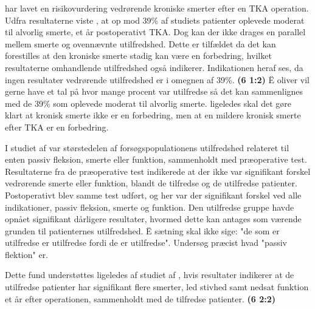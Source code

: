 \cite{Sakellariou2016} har lavet en risikovurdering vedrørende kroniske smerter efter en TKA operation. Udfra resultaterne viste \cite{Sakellariou2016}, at op mod 39\% af studiets patienter oplevede moderat til alvorlig smerte, et år postoperativt TKA. Dog kan der ikke drages en parallel mellem smerte og ovennævnte utilfredshed. Dette er tilfældet da det kan forestilles at den kroniske smerte stadig kan være en forbedring, hvilket resultaterne omhandlende utilfredshed også indikerer. Indikationen heraf ses, da ingen resultater vedrørende utilfredshed er i omegnen af 39\%. \textbf{(6 1:2)} \citep{Sakellariou2016} 
Ë oliver vil gerne have et tal på hvor mange procent var utilfredse så det kan sammenlignes med de 39\% som oplevede moderat til alvorlig smerte. ligeledes skal det gøre klart at kronisk smerte ikke er en forbedring, men at en mildere kronisk smerte efter TKA er en forbedring.

I studiet af \cite{Jacobs2014} var størstedelen af forsøgspopulationens utilfredshed relateret til enten passiv fleksion, smerte eller funktion, sammenholdt med præoperative test. Resultaterne fra de præoperative test indikerede at der ikke var signifikant forskel vedrørende smerte eller funktion, blandt de tilfredse og de utilfredse patienter. Postoperativt blev samme test udført, og her var der signifikant forskel ved alle indikationer, passiv fleksion, smerte og funktion. 
Den utilfredse gruppe havde opnået signifikant dårligere resultater, hvormed dette kan antages som værende grunden til patienternes utilfredshed. \citep{Jacobs2014} 
Ë sætning skal ikke sige: "de som er utilfredse er utilfredse fordi de er utilfredse". Undersøg præcist hvad "passiv flektion" er. 


Dette fund understøttes ligeledes af studiet af \cite{Bourne2010}, hvis resultater indikerer at de utilfredse patienter har signifikant flere smerter, led stivhed samt nedsat funktion et år efter operationen, sammenholdt med de tilfredse patienter. \citep{Bourne2010} \textbf{(6 2:2)}  

